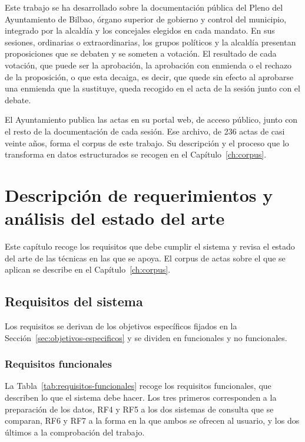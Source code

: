 \documentclass[11pt, a4paper]{report}
\begin{document}
	Este trabajo se ha desarrollado sobre la documentación pública del Pleno del
	Ayuntamiento de Bilbao, órgano superior de gobierno y control del municipio,
	integrado por la alcaldía y los concejales elegidos en cada mandato. En sus
	sesiones, ordinarias o extraordinarias, los grupos políticos y la alcaldía
	presentan proposiciones que se debaten y se someten a votación. El resultado
	de cada votación, que puede ser la aprobación, la aprobación con enmienda o el
	rechazo de la proposición, o que esta decaiga, es decir, que quede sin efecto
	al aprobarse una enmienda que la sustituye, queda recogido en el acta de la
	sesión junto con el debate.

	El Ayuntamiento publica las actas en su portal web, de acceso público, junto
	con el resto de la documentación de cada sesión. Ese archivo, de 236 actas de casi veinte años, forma el corpus de este trabajo. Su
	descripción y el proceso que lo transforma en datos estructurados se recogen
	en el Capítulo~\ref{ch:corpus}.

	\chapter{Descripción de requerimientos y análisis del estado del arte}
	\label{ch:estadodelarte}

	Este capítulo recoge los requisitos que debe cumplir el sistema y revisa el
	estado del arte de las técnicas en las que se apoya. El corpus de actas sobre
	el que se aplican se describe en el Capítulo~\ref{ch:corpus}.

	\section{Requisitos del sistema}

	Los requisitos se derivan de los objetivos específicos fijados en la
	Sección~\ref{sec:objetivos-especificos} y se dividen en funcionales y no
	funcionales.

	\subsection{Requisitos funcionales}

	La Tabla~\ref{tab:requisitos-funcionales} recoge los requisitos funcionales,
	que describen lo que el sistema debe hacer. Los tres primeros corresponden a
	la preparación de los datos, RF4 y RF5 a los dos sistemas de consulta que se
	comparan, RF6 y RF7 a la forma en la que ambos se ofrecen al usuario, y los
	dos últimos a la comprobación del trabajo.
\end{document}
